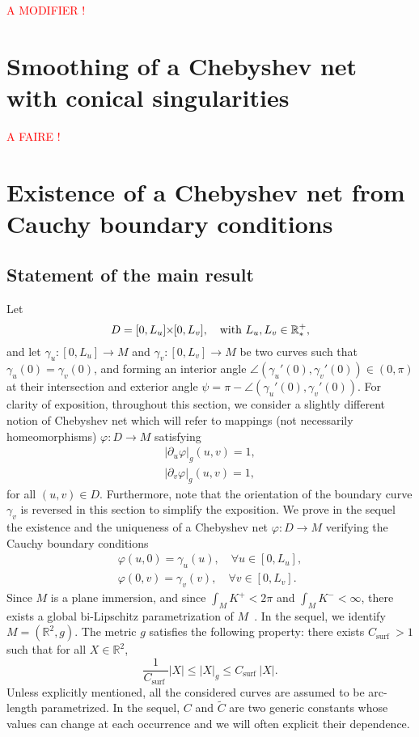 \documentclass{article}
\newcommand{\Csurf}{C_{\text{surf }}}
\newcommand{\PLH}{{\mkern-1mu\times\mkern-1mu}}
\newcommand{\Times}{\PLH}
\newcommand{\R}{\mathbb{R}}
\newcommand{\surf}{M}
\newcommand{\modif}[1]{\textcolor{red}{#1}}
\theoremstyle{remark}
\theoremstyle{prpart}
\begin{document}
\modif{A MODIFIER !}

\section{Smoothing of a Chebyshev net with conical singularities}
\modif{A FAIRE !}

\section{Existence of a Chebyshev net from Cauchy boundary conditions}
\label{sec:chap4}
\subsection{Statement of the main result}
Let 
\begin{equation*}
  D=[0,L_u]\Times[0,L_v],\quad\text{with } L_u,L_v\in\R_\ast^+,
\end{equation*}
 and let $\gamma_u:[0,L_u]\to\surf$ and $\gamma_v:[0,L_v]\to\surf$ be
 two curves such that $\gamma_u(0)=\gamma_v(0)$, and forming an
 interior angle $\angle(\gamma_u'(0),\gamma_v'(0))\in(0,\pi)$ at their
 intersection and exterior angle
 $\psi=\pi-\angle(\gamma_u'(0),\gamma_v'(0))$. For clarity of
 exposition, throughout this section, we consider a slightly different
 notion of Chebyshev net which will refer to mappings (not necessarily
 homeomorphisms) $\varphi:D\to\surf$ satisfying
\begin{subequations}\label{eq:cheb-def-c3}
\begin{align}\label{eq:cheb-def-c3a}
|\partial_u \varphi|_g(u,v) = 1,\\
|\partial_v \varphi|_g(u,v) = 1,\label{eq:cheb-def-c3b}
\end{align}
\end{subequations}
for all $(u,v)\in D$. Furthermore, note that the orientation of the boundary curve $\gamma_v$ is reversed in this section to simplify the exposition. 
We prove in the sequel the existence and the uniqueness of a Chebyshev net $\varphi:D\to\surf$ verifying the Cauchy boundary conditions
\begin{equation}\label{eq:cond-bord-c3}
\begin{split}
  \varphi(u,0)=\gamma_u(u),\quad\forall u\in[0,L_u],\\ 
  \varphi(0,v)=\gamma_v(v),\quad\forall v\in[0,L_v].
\end{split}
\end{equation}
Since $\surf$ is a plane immersion, and since $\int_\surf{K^+}<2\pi$
and $\int_\surf{K^-}<\infty$, there exists a global bi-Lipschitz
parametrization of $\surf$~\cite{Bonk03}. In the sequel, we identify
$\surf=(\R^2,g)$. The metric $g$ satisfies the following property:
there exists $\Csurf>1$ such that for all $X\in\R^2$,
\begin{equation}\label{eq:equiv}
  \frac{1}{\Csurf}|X|\leq |X|_{g} \leq \Csurf|X|.
\end{equation}
Unless explicitly mentioned, all the considered curves are assumed to be arc-length parametrized. In the sequel, $C$ and $\tilde C$ are two generic constants whose values can change at each occurrence and we will often explicit their dependence.
\end{document}
